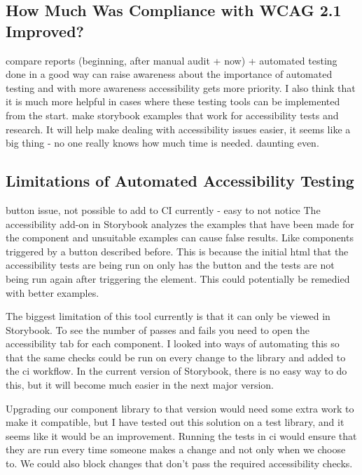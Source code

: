 \documentclass{master_thesis}
\begin{document}
\subsection{How Much Was Compliance with WCAG 2.1 Improved?}

compare reports (beginning, after manual audit + now) + automated testing done in a good way can raise awareness about the importance of automated testing and with more awareness accessibility gets more priority. I also think that it is much more helpful in cases where these testing tools can be implemented from the start. make storybook examples that work for accessibility tests and research. It will help make dealing with accessibility issues easier, it seems like a big thing - no one really knows how much time is needed. daunting even.

\subsection{Limitations of Automated Accessibility Testing}
button issue, not possible to add to CI currently - easy to not notice
The accessibility add-on in Storybook analyzes the examples that have been made for the component and unsuitable examples can cause false results. Like components triggered by a button described before. This is because the initial \ac{html} that the accessibility tests are being run on only has the button and the tests are not being run again after triggering the element. This could potentially be remedied with better examples.

The biggest limitation of this tool currently is that it can only be viewed in Storybook. To see the number of passes and fails you need to open the accessibility tab for each component. I looked into ways of automating this so that the same checks could be run on every change to the library and added to the \ac{ci} workflow. In the current version of Storybook, there is no easy way to do this, but it will become much easier in the next major version.

Upgrading our component library to that version would need some extra work to make it compatible, but I have tested out this solution on a test library, and it seems like it would be an improvement. Running the tests in \ac{ci} would ensure that they are run every time someone makes a change and not only when we choose to. We could also block changes that don't pass the required accessibility checks.

\end{document}

